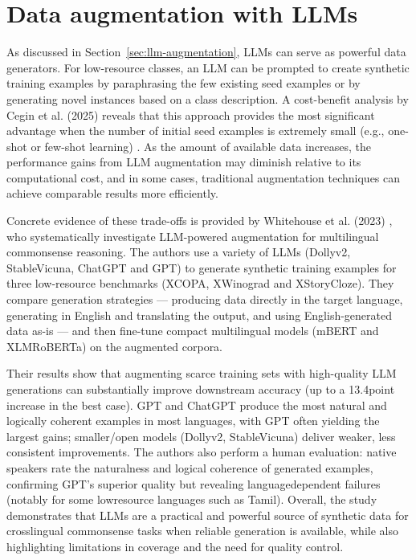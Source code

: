 \section{Data augmentation with LLMs}
As discussed in Section~\ref{sec:llm-augmentation}, LLMs can serve as powerful data generators. For low-resource classes, an LLM can be prompted to create synthetic training examples by paraphrasing the few existing seed examples or by generating novel instances based on a class description. A cost-benefit analysis by Cegin et al. (2025) reveals that this approach provides the most significant advantage when the number of initial seed examples is extremely small (e.g., one-shot or few-shot learning) \cite{cegin-etal-2025-llms}. As the amount of available data increases, the performance gains from LLM augmentation may diminish relative to its computational cost, and in some cases, traditional augmentation techniques can achieve comparable results more efficiently. \cite{cegin-etal-2025-llms}

Concrete evidence of these trade-offs is provided by Whitehouse et al. (2023) \cite{whitehouse2023llm}, who systematically investigate LLM-powered augmentation for multilingual commonsense reasoning. The authors use a variety of LLMs (Dolly\-v2, StableVicuna, ChatGPT and GPT) to generate synthetic training examples for three low-resource benchmarks (XCOPA, XWinograd and XStoryCloze). They compare generation strategies — producing data directly in the target language, generating in English and translating the output, and using English-generated data as-is — and then fine-tune compact multilingual models (mBERT and XLM\-RoBERTa) on the augmented corpora.

Their results show that augmenting scarce training sets with high-quality LLM generations can substantially improve downstream accuracy (up to a 13.4\-point increase in the best case). GPT and ChatGPT produce the most natural and logically coherent examples in most languages, with GPT often yielding the largest gains; smaller/open models (Dolly\-v2, StableVicuna) deliver weaker, less consistent improvements. The authors also perform a human evaluation: native speakers rate the naturalness and logical coherence of generated examples, confirming GPT's superior quality but revealing language\-dependent failures (notably for some low\-resource languages such as Tamil). Overall, the study demonstrates that LLMs are a practical and powerful source of synthetic data for cross\-lingual commonsense tasks when reliable generation is available, while also highlighting limitations in coverage and the need for quality control.
